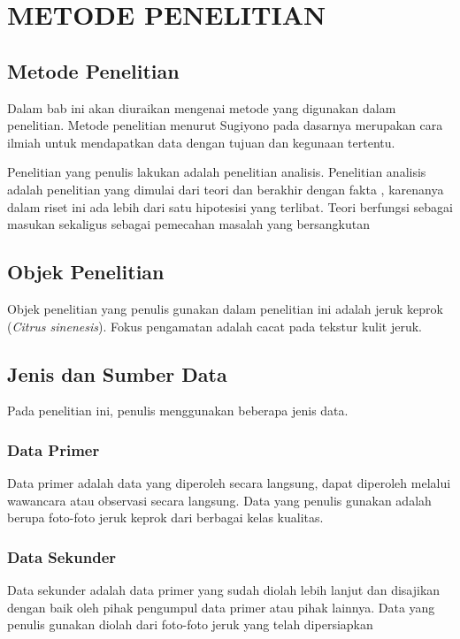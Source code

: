 \documentclass[laporan.tex]{subfiles}
\begin{document}
\chapter{METODE PENELITIAN}

\section{Metode Penelitian}

Dalam bab ini akan diuraikan mengenai metode yang digunakan dalam penelitian. Metode penelitian menurut Sugiyono pada dasarnya merupakan cara ilmiah untuk mendapatkan data dengan tujuan dan kegunaan tertentu.

Penelitian yang penulis lakukan adalah penelitian analisis. Penelitian analisis adalah penelitian yang dimulai dari teori dan berakhir dengan fakta , karenanya dalam riset ini ada lebih dari satu hipotesisi yang terlibat. Teori berfungsi sebagai masukan sekaligus sebagai pemecahan masalah yang bersangkutan

\section{Objek Penelitian}

Objek penelitian yang penulis gunakan dalam penelitian ini adalah jeruk keprok (\emph{Citrus sinenesis}). Fokus pengamatan adalah cacat pada tekstur kulit jeruk.

\section{Jenis dan Sumber Data}

Pada penelitian ini, penulis menggunakan beberapa jenis data.

\subsection{Data Primer}

Data primer adalah data yang diperoleh secara langsung, dapat diperoleh melalui wawancara atau observasi secara langsung. Data yang penulis gunakan adalah berupa foto-foto jeruk keprok dari berbagai kelas kualitas.

\subsection{Data Sekunder}

Data sekunder adalah data primer yang sudah diolah lebih lanjut dan disajikan dengan baik oleh pihak pengumpul data primer atau pihak lainnya. Data yang penulis gunakan diolah dari foto-foto jeruk yang telah dipersiapkan
\end{document}

